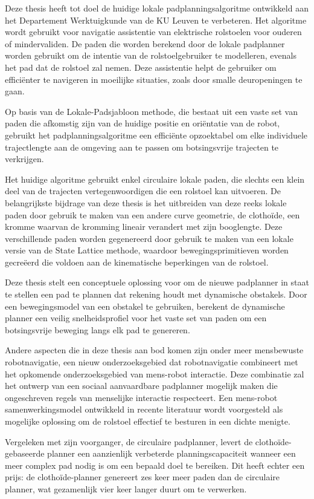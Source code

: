 \documentclass[twoside,english,master=wtk,inputenc="utf8"]{kulemt}
\begin{document}
\begin{abstract*}
\vspace{-1.03em}
Deze thesis heeft tot doel de huidige lokale padplanningsalgoritme ontwikkeld aan het Departement Werktuigkunde van de KU Leuven te verbeteren. Het algoritme wordt gebruikt voor navigatie assistentie van elektrische rolstoelen voor ouderen of mindervaliden. De paden die worden berekend door de lokale padplanner worden gebruikt om de intentie van de rolstoelgebruiker te modelleren, evenals het pad dat de rolstoel zal nemen. Deze assistentie helpt de gebruiker om efficiënter te navigeren in moeilijke situaties, zoals door smalle deuropeningen te gaan.

Op basis van de Lokale-Padsjabloon methode, die bestaat uit een vaste set van paden die afkomstig zijn van de huidige positie en oriëntatie van de robot, gebruikt het padplanningsalgoritme een efficiënte opzoektabel om elke individuele trajectlengte aan de omgeving aan te passen om botsingsvrije trajecten te verkrijgen.

Het huidige algoritme gebruikt enkel circulaire lokale paden, die slechts een klein deel van de trajecten vertegenwoordigen die een rolstoel kan uitvoeren. De belangrijkste bijdrage van deze thesis is het uitbreiden van deze reeks lokale paden door gebruik te maken van een andere curve geometrie, de clothoïde, een kromme waarvan de kromming lineair verandert met zijn booglengte. Deze verschillende paden worden gegenereerd door gebruik te maken van een lokale versie van de State Lattice methode, waardoor bewegingsprimitieven worden gecreëerd die voldoen aan de kinematische beperkingen van de rolstoel.

Deze thesis stelt een conceptuele oplossing voor om de nieuwe padplanner in staat te stellen een pad te plannen dat rekening houdt met dynamische obstakels. Door een bewegingsmodel van een obstakel te gebruiken, berekent de dynamische planner een veilig snelheidsprofiel voor het vaste set van paden om een botsingsvrije beweging langs elk pad te genereren.


Andere aspecten die in deze thesis aan bod komen zijn onder meer mensbewuste robotnavigatie, een nieuw onderzoeksgebied dat robotnavigatie combineert met het opkomende onderzoeksgebied van mens-robot interactie. Deze combinatie zal het ontwerp van een sociaal aanvaardbare padplanner mogelijk maken die ongeschreven regels van menselijke interactie respecteert. Een mens-robot samenwerkingsmodel ontwikkeld in recente literatuur wordt voorgesteld als mogelijke oplossing om de rolstoel effectief te besturen in een dichte menigte.

Vergeleken met zijn voorganger, de circulaire padplanner, levert de clothoïde-gebaseerde planner een aanzienlijk verbeterde planningscapaciteit wanneer een meer complex pad nodig is om een bepaald doel te bereiken. Dit heeft echter een prijs: de clothoïde-planner genereert zes keer meer paden dan de circulaire planner, wat gezamenlijk vier keer langer duurt om te verwerken.
\end{abstract*}
\end{document}

